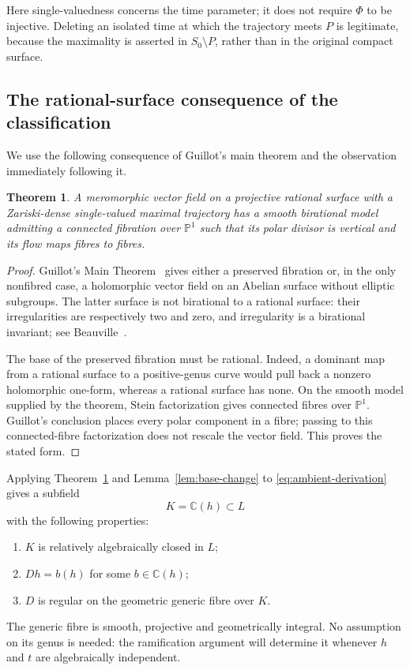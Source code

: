 \documentclass[11pt,reqno]{amsart}
\numberwithin{equation}{section}
\newtheorem{theorem}{Theorem}[section]
\theoremstyle{definition}
\theoremstyle{remark}
\newcommand{\C}{\mathbb C}
\newcommand{\PP}{\mathbb P}
\begin{document}
Here single-valuedness concerns the time parameter; it does not require
$\Phi$ to be injective. Deleting an isolated time at which the trajectory
meets $P$ is legitimate, because the maximality is asserted in
$S_0\setminus P$, rather than in the original compact surface.

\subsection{The rational-surface consequence of the classification}

We use the following consequence of Guillot's main theorem and the
observation immediately following it.

\begin{theorem}
\label{thm:guillot}
A meromorphic vector field on a projective rational surface with a
Zariski-dense single-valued maximal trajectory has a smooth birational
model admitting a connected fibration over $\PP^1$ such that its polar
divisor is vertical and its flow maps fibres to fibres.
\end{theorem}

\begin{proof}
Guillot's Main Theorem~\cite[Main Theorem and the paragraph following
it]{Guillot2019} gives either a preserved fibration or, in the only
nonfibred case, a holomorphic vector field on an Abelian surface without
elliptic subgroups. The latter surface is not birational to a rational
surface: their irregularities are respectively two and zero, and
irregularity is a birational invariant; see
Beauville~\cite{Beauville1996}.

The base of the preserved fibration must be rational. Indeed, a dominant
map from a rational surface to a positive-genus curve would pull back a
nonzero holomorphic one-form, whereas a rational surface has none.
On the smooth model supplied by the theorem, Stein factorization gives
connected fibres over $\PP^1$. Guillot's conclusion places every polar
component in a fibre; passing to this connected-fibre factorization does
not rescale the vector field. This proves the stated form.
\end{proof}

Applying Theorem~\ref{thm:guillot} and
Lemma~\ref{lem:base-change} to \eqref{eq:ambient-derivation} gives a
subfield
\begin{equation}
 K=\C(h)\subset L
 \label{eq:base-field}
\end{equation}
with the following properties:
\begin{enumerate}
\item $K$ is relatively algebraically closed in $L$;
\item $Dh=b(h)$ for some $b\in\C(h)$;
\item $D$ is regular on the geometric generic fibre over $K$.
\end{enumerate}
The generic fibre is smooth, projective and geometrically integral.
No assumption on its genus is needed: the ramification argument will
determine it whenever $h$ and $t$ are algebraically independent.
\end{document}
